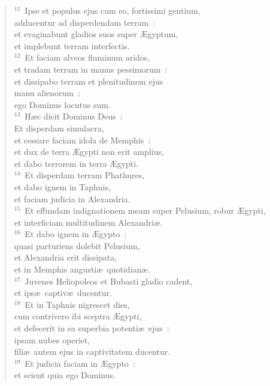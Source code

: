 \begin{verse}
${}^{11}$~Ipse et populus ejus cum eo, fortissimi gentium,\\ adducentur ad disperdendam terram~:\\ et evaginabunt gladios suos super \AE gyptum,\\ et implebunt terram interfectis.\\
${}^{12}$~Et faciam alveos fluminum aridos,\\ et tradam terram in manus pessimorum~:\\ et dissipabo terram et plenitudinem ejus\\ manu alienorum~:\\ ego Dominus locutus sum.\\
${}^{13}$~H\ae c dicit Dominus Deus~:\\ Et disperdam simulacra,\\ et cessare faciam idola de Memphis~:\\ et dux de terra \AE gypti non erit amplius,\\ et dabo terrorem in terra \AE gypti.\\
${}^{14}$~Et disperdam terram Phathures,\\ et dabo ignem in Taphnis,\\ et faciam judicia in Alexandria.\\
${}^{15}$~Et effundam indignationem meam super Pelusium, robur \AE gypti,\\ et interficiam multitudinem Alexandri\ae .\\
${}^{16}$~Et dabo ignem in \AE gypto~:\\ quasi parturiens dolebit Pelusium,\\ et Alexandria erit dissipata,\\ et in Memphis angusti\ae\ quotidian\ae .\\
${}^{17}$~Juvenes Heliopoleos et Bubasti gladio cadent,\\ et ips\ae\ captiv\ae\ ducentur.\\
${}^{18}$~Et in Taphnis nigrescet dies,\\ cum contrivero ibi sceptra \AE gypti,\\ et defecerit in ea superbia potenti\ae\ ejus~:\\ ipsam nubes operiet,\\ fili\ae\ autem ejus in captivitatem ducentur.\\
${}^{19}$~Et judicia faciam in \AE gypto~:\\ et scient quia ego Dominus.\end{verse}



